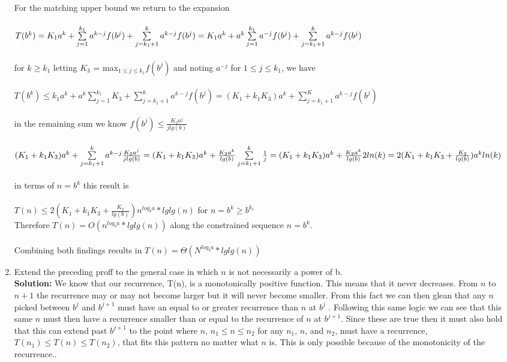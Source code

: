 \documentclass[11pt]{article}
\begin{document}
\begin{enumerate}
For the matching upper bound we return to the expansion\\\\$T(b^k)=K_1a^k+\sum\limits_{j=1}^{k_1}a^{k-j}f(b^j)+\sum\limits_{j=k_1+1}^{k}a^{k-j}f(b^j)\\ = K_1a^k+a^k\sum\limits_{j=1}^{k_1}a^{-j}f(b^j)+\sum\limits_{j=k_1+1}^{k}a^{k-j}f(b^j)$\\\\for $k \geq k_1$ letting $K_3$ = max$_{1 \leq j \leq k_1}f(b^j)$ and noting $a^{-j}$ for $1 \leq j \leq k_1$, we have\\\\$T(b^k) \leq k_1a^k+a^k\sum\limits_{j=1}^{k_1}K_3+\sum\limits_{j=k_1+1}^{k}a^{k-j}f(b^j)=(K_1+k_1K_3)a^k+\sum\limits_{j=k_1+1}^{K}a^{k-j}f(b^j)$\\\\in the remaining sum we know $f(b^j) \leq \frac{K_2a^j}{jlg(b)}$\\\\$(K_1+k_1K_3)a^k+\sum\limits_{j=k_1+1}^{k}a^{k-j}\frac{K_2a^j}{jlg(b)} =(K_1+k_1K_3)a^k+\frac{K_2a^k}{lg(b)}\sum\limits_{j=k_1+1}^{k}\frac{1}{j}\\=(K_1+k_1K_3)a^k+\frac{K_2a^k}{lg(b)}2ln(k)=2(K_1+k_1K_3+\frac{K_2}{lg(b)})a^kln(k)$\\\\in terms of $n = b^k$ this result is\\\\$T(n) \leq 2(K_1+k_1K_3+\frac{K_2}{lg(b)})n^{log_ba}*lglg(n)$ for $n = b^k \geq b^{k_1}$\\Therefore $T(n) = O(n^{log_ba}*lglg(n))$ along the constrained sequence $n = b^k$.\\\\Combining both findings results in $T(n) = \Theta(N^{log_ba}*lglg(n))$

\item Extend the preceding proff to the general case in which $n$ is not necessarily a power of b.\\

\textbf{Solution:} We know that our recurrence, T(n), is a monotonically positive function. This means that it never decreases. From $n$ to $n+1$ the recurrence may or may not become larger but it will never become smaller. From this fact we can then glean that any $n$ picked between $b^j$ and $b^{j+1}$ must have an equal to or greater recurrence than $n$ at $b^j$ . Following this same logic we can see that this same $n$ must then have a recurrence smaller than or equal to the recurrence of $n$ at $b^{j+1}$. Since these are true then it must also hold that this can extend past $b^{j+1}$ to the point where $n$, $n_1 \leq n \leq n_2$ for any $n_1$, $n$, and $n_2$, must have a recurrence, $T(n_1) \leq T(n) \leq T(n_2)$, that fits this pattern no matter what $n$ is. This is only possible because of the monotonicity of the recurrence..

\end{enumerate}
\end{document}
